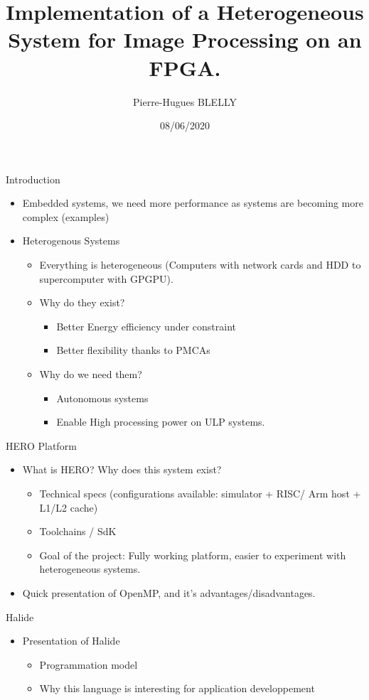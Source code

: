\documentclass[aspectratio=169]{beamer}
\author{Pierre-Hugues BLELLY}
\date{08/06/2020}
\title{Implementation of a Heterogeneous System for Image Processing on an FPGA.}
\begin{document}
\lstset{basicstyle=\ttfamily\footnotesize,breaklines=true,tabsize=2}
\frame{\titlepage}

\begin{frame}{Introduction}
	\begin{itemize}
		\item Embedded systems, we need more performance as systems are becoming more complex
			(examples)
		\item Heterogenous Systems
			\begin{itemize}
				\item Everything is heterogeneous (Computers with network cards and HDD to supercomputer with GPGPU).
				\item Why do they exist?
					\begin{itemize}
						\item Better Energy efficiency under constraint
						\item Better flexibility thanks to PMCAs
					\end{itemize}
				\item Why do we need them?
					\begin{itemize}
						\item Autonomous systems
						\item Enable High processing power on ULP systems.
					\end{itemize}
			\end{itemize}
	\end{itemize}
\end{frame}

\begin{frame}{HERO Platform}
	\begin{itemize}
		\item What is HERO? Why does this system exist?
			\begin{itemize}
				\item Technical specs (configurations available: simulator + RISC/ Arm host + L1/L2 cache)
				\item Toolchains / SdK
				\item Goal of the project: Fully working platform, easier to experiment with heterogeneous systems.
			\end{itemize}
		\item Quick presentation of OpenMP, and it's advantages/disadvantages.
	\end{itemize}
\end{frame}

\begin{frame}{Halide}
	\begin{itemize}
		\item Presentation of Halide
			\begin{itemize}
				\item Programmation model
				\item Why this language is interesting for application developpement
			\end{itemize}
	\end{itemize}
\end{frame}
\end{document}
